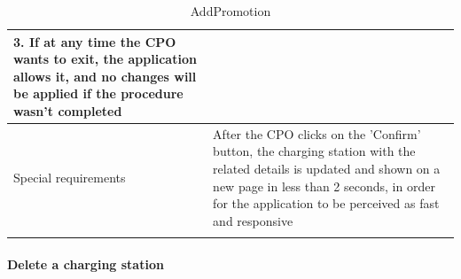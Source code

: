 \begin{center}
\begin{longtable}{p{4cm} p{11cm}}
                    3. If at any time the CPO wants to exit, the application allows it, and no changes will be applied if the procedure wasn't completed \\
     \hline
     Special requirements & After the CPO clicks on the 'Confirm' button, the charging station with the related details is updated and shown on a new page in less than 2 seconds, in order for the application to be perceived as fast and responsive\\
     \hline
    \caption{AddPromotion}
    \label{tab:AddPromotion}
    \end{longtable}
\end{center}

\paragraph{Delete a charging station}

